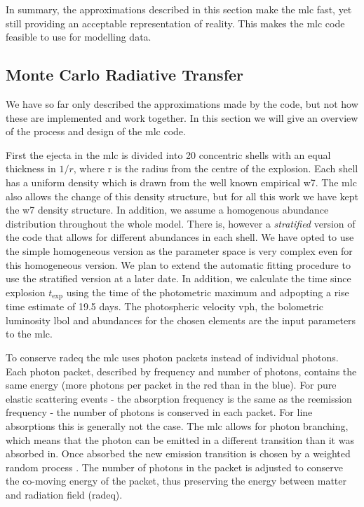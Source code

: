 In summary, the approximations described in this section make the \gls{mlc} fast, yet still providing an acceptable representation of reality. This makes the \gls{mlc} code feasible to use for modelling data. 

\subsection{Monte Carlo Radiative Transfer}

We have so far only described the approximations made by the code, but not how these are implemented and work together. In this section we will give an overview of the process and design of the \gls{mlc} code.

First the ejecta in the \gls{mlc} is divided into 20 concentric shells with an equal thickness in $1/r$, where r is the radius from the centre of the explosion. Each shell has a uniform density which is drawn from the well known empirical \gls{w7}. The \gls{mlc} also allows the change of this density structure, but for all this work we have kept the \gls{w7} density structure. In addition, we assume a homogenous abundance distribution throughout the whole model. There is, however a \textit{stratified} version of the code that allows for different abundances in each shell. We have opted to use the simple homogeneous version as the parameter space is very complex even for this homogeneous version. We plan to extend the automatic fitting procedure to use the stratified version at a later date. In addition, we calculate the time since explosion $t_\textrm{exp}$ using the time of the photometric maximum and adpopting a rise time estimate of 19.5 days. The photospheric velocity \gls{vph}, the bolometric luminosity \gls{lbol} and abundances for the chosen elements are the input parameters to the \gls{mlc}. 

To conserve \gls{radeq} the \gls{mlc} uses photon packets instead of individual photons. Each photon packet, described by  frequency and number of photons, contains the same energy (more photons per packet in the red than in the blue). For pure elastic scattering events - the absorption frequency is the same as the reemission frequency - the number of photons is conserved in each packet. For line absorptions this is generally not the case. The \gls{mlc} allows for photon branching, which means that the photon can be emitted in a different transition than it was absorbed in. Once absorbed the new emission transition is chosen by a weighted random process \citep[for a more details see][]{2000A&A...363..705M}. The number of photons in the packet is adjusted to conserve the co-moving energy of the packet, thus preserving the energy between matter and radiation field (\gls{radeq}).


